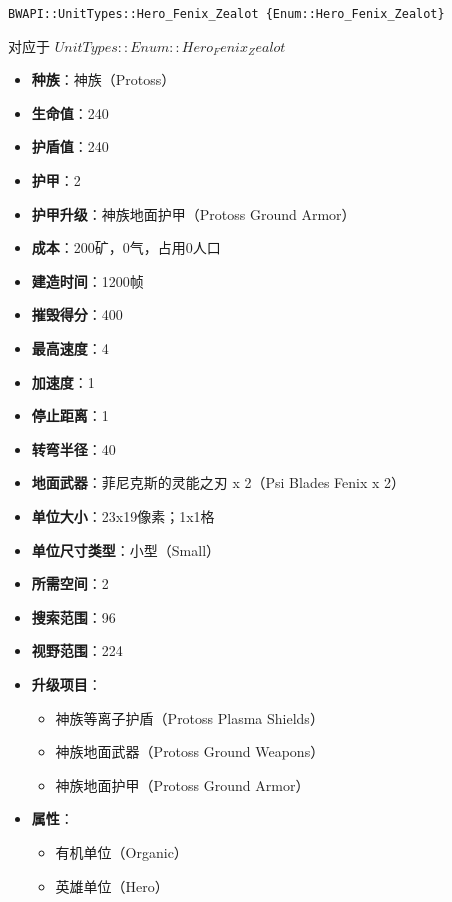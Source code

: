 \begin{tcolorbox}[colback=white, colframe=black!60!white, title=Hero\_Fenix\_Zealot(), arc=0mm]
    \begin{verbatim}
BWAPI::UnitTypes::Hero_Fenix_Zealot {Enum::Hero_Fenix_Zealot}
    \end{verbatim}
    对应于  $ UnitTypes::Enum::Hero_Fenix_Zealot $ 
    \begin{itemize}
        \item \textbf{种族}：神族（Protoss）
        \item \textbf{生命值}：240
        \item \textbf{护盾值}：240
        \item \textbf{护甲}：2
        \item \textbf{护甲升级}：神族地面护甲（Protoss Ground Armor）
        \item \textbf{成本}：200矿，0气，占用0人口
        \item \textbf{建造时间}：1200帧
        \item \textbf{摧毁得分}：400
        \item \textbf{最高速度}：4
        \item \textbf{加速度}：1
        \item \textbf{停止距离}：1
        \item \textbf{转弯半径}：40
        \item \textbf{地面武器}：菲尼克斯的灵能之刃 x 2（Psi Blades Fenix x 2）
        \item \textbf{单位大小}：23x19像素；1x1格
        \item \textbf{单位尺寸类型}：小型（Small）
        \item \textbf{所需空间}：2
        \item \textbf{搜索范围}：96
        \item \textbf{视野范围}：224
        \item \textbf{升级项目}：
            \begin{itemize}
                \item 神族等离子护盾（Protoss Plasma Shields）
                \item 神族地面武器（Protoss Ground Weapons）
                \item 神族地面护甲（Protoss Ground Armor）
            \end{itemize}
        \item \textbf{属性}：
            \begin{itemize}
                \item 有机单位（Organic）
                \item 英雄单位（Hero）
            \end{itemize}
    \end{itemize}
\end{tcolorbox}

